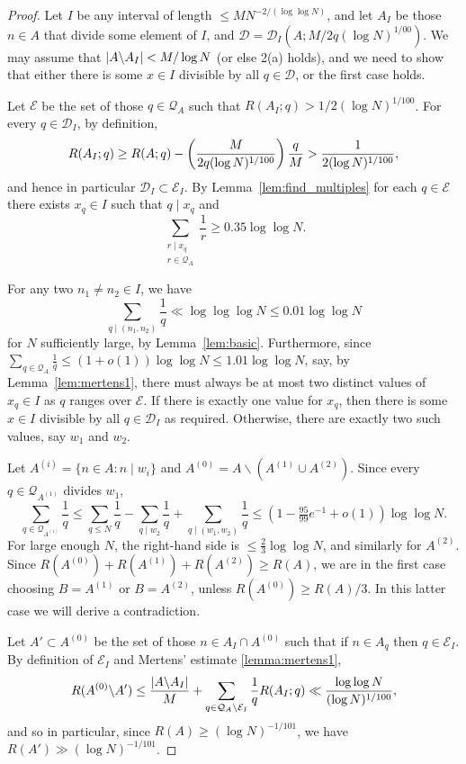 \begin{proof}
Let $I$ be any interval of length $\leq MN^{-2/(\log\log N)}$, and let $A_I$ be those $n\in A$ that divide some element of $I$, and $\mathcal{D}=\mathcal{D}_I(A;M/2q(\log N)^{1/00})$. We may assume that $\left\lvert A\backslash A_I\right\rvert< M/\log N$ (or else 2(a) holds), and we need to show that either there is some $x\in I$ divisible by all $q\in\mathcal{D}$, or the first case holds.

Let $\mathcal{E}$ be the set of those $q\in\mathcal{Q}_A$ such that $R(A_I;q)> 1/2(\log N)^{1/100}$. For every $q\in \mathcal{D}_I$, by definition,
  \[R(A_I; q) \geq R(A;q) - \left( \frac{M}{2q(\log N)^{1/100}}\right)\frac{q}{M}>\frac{1}{2(\log N)^{1/100}},\]
  and hence in particular $\mathcal{D}_I\subset \mathcal{E}_I$. By Lemma~\ref{lem:find_multiples} for each $q\in\mathcal{E}$ there exists $x_q\in I$ such that $q\mid x_q$ and
\[\sum_{\substack{r\mid x_q\\ r\in \mathcal{Q}_A}}\frac{1}{r}\geq 0.35\log\log N.\]

 For any two $n_1\neq n_2\in I$, we have
  \[\sum_{q\mid (n_1,n_2)}\frac{1}{q}\ll \log\log\log N\leq 0.01\log\log N\]
  for $N$ sufficiently large, by Lemma~\ref{lem:basic}.  Furthermore, since $\sum_{q\in\mathcal{Q}_A}\frac{1}{q}\leq (1+o(1))\log\log N\leq 1.01\log\log N$, say, by Lemma~\ref{lem:mertens1}, there must always be at most two distinct values of $x_q\in I$ as $q$ ranges over $\mathcal{E}$. If there is exactly one value for $x_q$, then there is some $x\in I$ divisible by all $q\in\mathcal{D}_I$ as required. Otherwise, there are exactly two such values, say $w_1$ and $w_2$.

  Let $A^{(i)}=\{n\in A: n\mid w_i\}$ and $A^{(0)}=A\backslash (A^{(1)}\cup A^{(2)})$. Since every $q\in\mathcal{Q}_{A^{(1)}}$ divides $w_1$,
  \[\sum_{q\in \mathcal{Q}_{A^{(1)}}}\frac{1}{q}\leq \sum_{q\leq N}\frac{1}{q}- \sum_{q\mid w_2}\frac{1}{q}+ \sum_{q\mid (w_1,w_2)}\frac{1}{q}\leq (1-\tfrac{95}{99}e^{-1}+o(1))\log\log N.\]
  For large enough $N$, the right-hand side is $\leq \frac{2}{3}\log\log N$, and similarly for $A^{(2)}$. Since $R(A^{(0)})+R(A^{(1)})+R(A^{(2)})\geq R(A)$, we are in the first case choosing $B=A^{(1)}$ or $B=A^{(2)}$, unless $R(A^{(0)})\geq R(A)/3$. In this latter case we will derive a contradiction.

  Let $A'\subset A^{(0)}$ be the set of those $n\in A_I\cap A^{(0)}$ such that if $n\in A_q$ then $q\in\mathcal{E}_I$. By definition of $\mathcal{E}_I$ and Mertens' estimate \ref{lemma:mertens1},
  \[R(A^{(0)}\backslash A')\leq \frac{\left\lvert A\backslash A_I\right\rvert}{M}+\sum_{q\in\mathcal{Q}_A\backslash \mathcal{E}_I}\frac{1}{q}R(A_I;q)\ll \frac{\log\log N}{(\log N)^{1/100}},\]
  and so  in particular, since $R(A)\geq (\log N)^{-1/101}$, we have $R(A')\gg (\log N)^{-1/101}$.


\end{proof}
